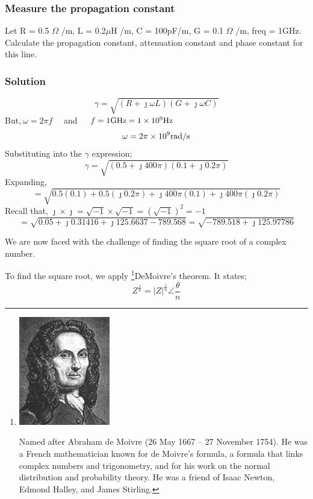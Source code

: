 \begin{exmp}
\subsubsection*{Measure the propagation constant}
Let R = 0.5 $\Omega$ /m, L = 0.2$\mu$H /m, C = 100pF/m, G = 0.1 $\Omega$ /m, freq = 1GHz. Calculate the propagation constant, attenuation constant and phase constant for this line.

\subsubsection*{Solution}
\[ \gamma = \sqrt{(R+\jmath\omega L)(G + \jmath\omega C)}\]
But,$ \ \omega = 2\pi f\quad$ and $\quad f = 1\textnormal{GHz} = 1 \times 10^9 \textnormal{Hz} $ 
\[\omega = 2\pi \times 10^9\textnormal{rad/s}\]
Substituting into the $ \gamma $ expression;
\[\gamma = \sqrt{(0.5 + \jmath 400\pi)(0.1 + \jmath 0.2\pi)}\]
Expanding,
\[ = \sqrt{0.5(0.1) + 0.5(\jmath 0.2\pi) + \jmath 400\pi(0.1) + \jmath 400\pi(\jmath 0.2\pi)}\]
Recall that, $ \jmath \times \jmath = \sqrt{-1} \times \sqrt{-1} = (\sqrt{-1})^2 = -1 $
\begin{dmath*}
=\sqrt{0.05 + \jmath 0.31416 +\jmath 125.6637 - 789.568}
= \sqrt{-789.518 + \jmath 125.97786}
\end{dmath*}

We are now faced with the challenge of finding the square root of a complex number.

To find the square root, we apply \footnote{
\includegraphics[scale=0.3]{graphics/demoivre}

Named after Abraham de Moivre (26 May 1667 – 27 November 1754). He was a French mathematician known for de Moivre's formula, a formula that links complex numbers and trigonometry, and for his work on the normal distribution and probability theory. He was a friend of Isaac Newton, Edmond Halley, and James Stirling.
}DeMoivre's theorem. It states; 
\begin{equation*}
Z^{\frac{1}{n}} = |Z|^{\frac{1}{n}}\angle\frac{\theta}{n}
\end{equation*}


\end{exmp}
